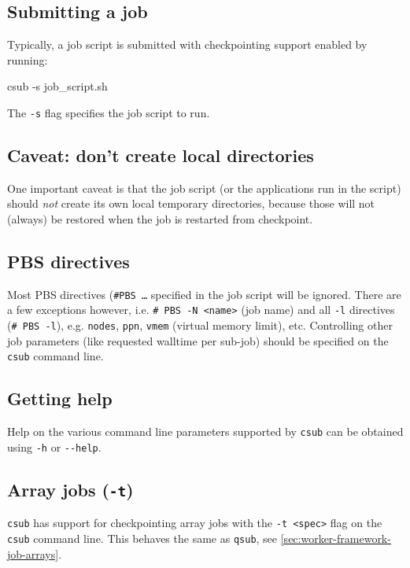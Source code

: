 \subsection{Submitting a job}

Typically, a job script is submitted with checkpointing support enabled by running:

\begin{prompt}
csub -s job_script.sh
\end{prompt}

The  \lstinline|-s| flag specifies the job script to run.

\subsection{Caveat: don't create local directories}

One important caveat is that the job script (or the applications run in the script)
should \emph{not} create its own local temporary directories, because those will not (always)
be restored when the job is restarted from checkpoint.

\subsection{PBS directives}

Most PBS directives (\texttt{\#PBS \ldots} specified in the job script will be ignored.
There are a few exceptions however, i.e. \lstinline|# PBS -N <name>| (job name)
and all \lstinline|-l| directives (\lstinline|# PBS -l|), e.g. \lstinline|nodes|,
\lstinline|ppn|, \lstinline|vmem| (virtual memory limit), etc.
Controlling other job parameters (like requested walltime per sub-job) should be
specified on the \lstinline|csub| command line.

\subsection{Getting help}

Help on the various command line parameters supported by \lstinline|csub| can be
obtained using \lstinline|-h| or \lstinline|--help|.


\subsection{Array jobs (\texttt{-t})}

\lstinline|csub| has support for checkpointing array jobs with the \lstinline|-t <spec>|
flag on the \lstinline|csub| command line. This behaves the same as \lstinline|qsub|, see \autoref{sec:worker-framework-job-arrays}.

